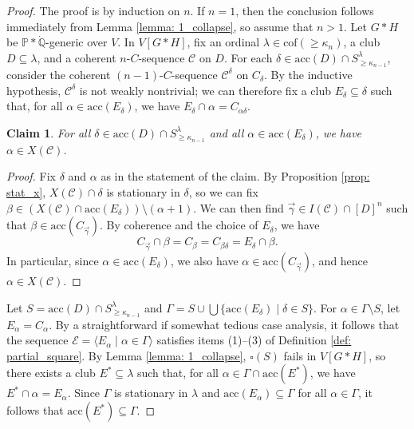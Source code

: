 \documentclass{amsart}
\numberwithin{theorem}{section}
\newtheorem{claim}{Claim}[theorem]
\theoremstyle{definition}
\newcommand{\bb}{\mathbb}
\newcommand{\acc}{\mathrm{acc}}
\newcommand{\mc}{\mathcal}
\newcommand{\Q}{\bb{Q}}
\renewcommand{\P}{\bb{P}}
\begin{document}
\begin{proof}
  The proof is by induction on $n$. If $n = 1$, then the conclusion follows immediately from 
  Lemma \ref{lemma: 1_collapse}, so assume that $n > 1$. Let $G \ast H$ be $\P \ast \dot{\Q}$-generic 
  over $V$. In $V[G \ast H]$, fix an ordinal $\lambda \in \mathrm{cof}({\geq} \kappa_n)$, a 
  club $D \subseteq \lambda$, and a coherent $n$-$C$-sequence $\mc{C}$ on $D$. 
  For each $\delta \in \acc(D) \cap S^\lambda_{{\geq}\kappa_{n-1}}$, consider the 
  coherent $(n-1)$-$C$-sequence $\mc{C}^\delta$ on $C_\delta$. By the inductive hypothesis, $\mc{C}^\delta$ is not weakly nontrivial; we can therefore fix a 
  club $E_\delta \subseteq \delta$ 
  such that, for all $\alpha \in \acc(E_\delta)$, we have $E_\delta \cap \alpha = C_{\alpha\delta}$. 
  
  \begin{claim} \label{claim: x_claim}
    For all $\delta \in \acc(D) \cap S^\lambda_{{\geq}\kappa_{n-1}}$ and all 
    $\alpha \in \acc(E_\delta)$, we have $\alpha \in X(\mc{C})$.
  \end{claim}
  
  \begin{proof}
    Fix $\delta$ and $\alpha$ as in the statement of the claim. By Proposition \ref{prop: stat_x}, 
    $X(\mc{C}) \cap \delta$ is stationary in $\delta$, so we can fix $\beta \in (X(\mc{C}) \cap 
    \acc(E_\delta)) \setminus (\alpha + 1)$. We can then find $\vec{\gamma} \in I(\mc{C}) \cap 
    [D]^n$ such that $\beta \in \acc(C_{\vec{\gamma}})$. By coherence and the choice of 
    $E_\delta$, we have
    \[
      C_{\vec{\gamma}} \cap \beta = C_\beta = C_{\beta\delta} = E_\delta \cap \beta.
    \]
    In particular, since $\alpha \in \acc(E_\delta)$, we also have $\alpha \in \acc(C_{\vec{\gamma}})$, 
    and hence $\alpha \in X(\mc{C})$.
  \end{proof}
  
  Let $S = \acc(D) \cap S^\lambda_{{\geq}\kappa_{n-1}}$ and $\Gamma = S \cup\bigcup \{\acc(E_\delta) 
  \mid \delta \in S\}$. For $\alpha \in \Gamma \setminus S$, let $E_\alpha = C_\alpha$. 
  By a straightforward if somewhat tedious case analysis, it follows that the sequence 
  $\mc{E} = \langle E_\alpha \mid \alpha \in \Gamma \rangle$ satisfies items (1)--(3) 
  of Definition \ref{def: partial_square}. By Lemma \ref{lemma: 1_collapse}, 
  $\square(S)$ fails in $V[G \ast H]$, so there exists a club $E^* \subseteq \lambda$ 
  such that, for all $\alpha \in \Gamma \cap \acc(E^*)$, we have $E^* \cap \alpha = 
  E_\alpha$. Since $\Gamma$ is stationary in $\lambda$ and $\acc(E_\alpha) \subseteq 
  \Gamma$ for all $\alpha \in \Gamma$, it follows that $\acc(E^*) \subseteq \Gamma$.
  

\end{proof}
\end{document}
